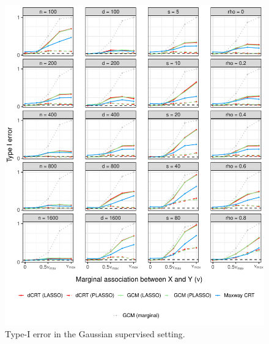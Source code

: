 \documentclass[12pt]{article}
\theoremstyle{definition}
\theoremstyle{remark}
\begin{document}
\begin{figure}[!ht]
	\centering
	\includegraphics[scale = 1]{figures/gaussian_supervised_setting_null.pdf}
	\caption{Type-I error in the Gaussian supervised setting.}
	\label{fig:gaussian_supervised_null}
\end{figure}
\end{document}
